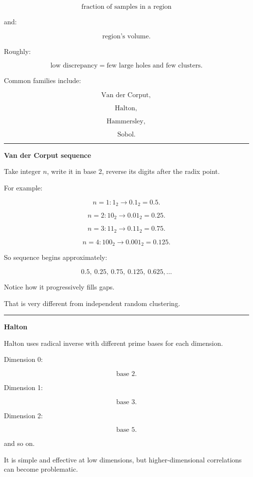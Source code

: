 \[
\text{fraction of samples in a region}
\]

and:

\[
\text{region's volume}.
\]

Roughly:

\[
\boxed{
\text{low discrepancy}
=
\text{few large holes and few clusters}.
}
\]

Common families include:

\[
\text{Van der Corput},
\]

\[
\text{Halton},
\]

\[
\text{Hammersley},
\]

\[
\text{Sobol}.
\]

\begin{center}\rule{0.5\linewidth}{0.5pt}\end{center}

\textbf{Van der Corput sequence}

Take integer \(n\), write it in base 2, reverse its digits after the radix point.

For example:

\[
n=1:
1_2
\rightarrow
0.1_2
=
0.5.
\]

\[
n=2:
10_2
\rightarrow
0.01_2
=
0.25.
\]

\[
n=3:
11_2
\rightarrow
0.11_2
=
0.75.
\]

\[
n=4:
100_2
\rightarrow
0.001_2
=
0.125.
\]

So sequence begins approximately:

\[
0.5,\ 0.25,\ 0.75,\ 0.125,\ 0.625,\dots
\]

Notice how it progressively fills gaps.

That is very different from independent random clustering.

\begin{center}\rule{0.5\linewidth}{0.5pt}\end{center}

\textbf{Halton}

Halton uses radical inverse with different prime bases for each dimension.

Dimension 0:

\[
\text{base }2.
\]

Dimension 1:

\[
\text{base }3.
\]

Dimension 2:

\[
\text{base }5.
\]

and so on.

It is simple and effective at low dimensions, but higher-dimensional correlations can become problematic.

